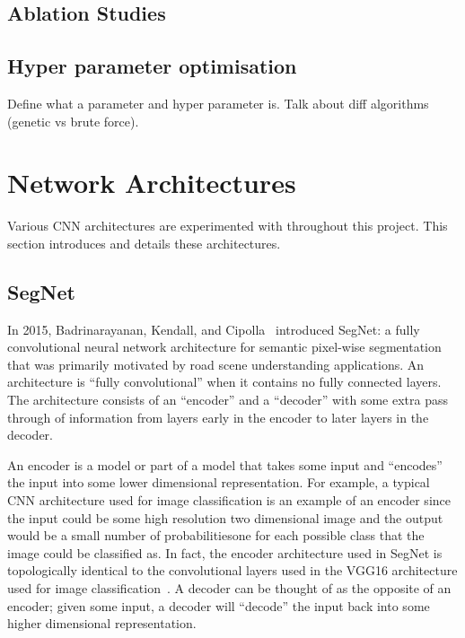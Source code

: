 \subsection{Ablation Studies}

\subsection{Hyper parameter optimisation}
\label{sec:hyperparam}

Define what a parameter and hyper parameter is. Talk about diff algorithms (genetic vs brute force).

\section{Network Architectures}

Various CNN architectures are experimented with throughout this project. This section introduces and details these architectures.

\subsection{SegNet}

In 2015, Badrinarayanan, Kendall, and Cipolla~\cite{segnet} introduced SegNet: a fully convolutional neural network architecture for semantic pixel-wise segmentation that was primarily motivated by road scene understanding applications. An architecture is ``fully convolutional'' when it contains no fully connected layers. The architecture consists of an ``encoder'' and a ``decoder'' with some extra pass through of information from layers early in the encoder to later layers in the decoder.

An encoder is a model or part of a model that takes some input and ``encodes'' the input into some lower dimensional representation. For example, a typical CNN architecture used for image classification is an example of an encoder since the input could be some high resolution two dimensional image and the output would be a small number of probabilities\textemdash one for each possible class that the image could be classified as. In fact, the encoder architecture used in SegNet is topologically identical to the convolutional layers used in the VGG16 architecture used for image classification~\cite{segnet, vgg16}. A decoder can be thought of as the opposite of an encoder; given some input, a decoder will ``decode'' the input back into some higher dimensional representation.

